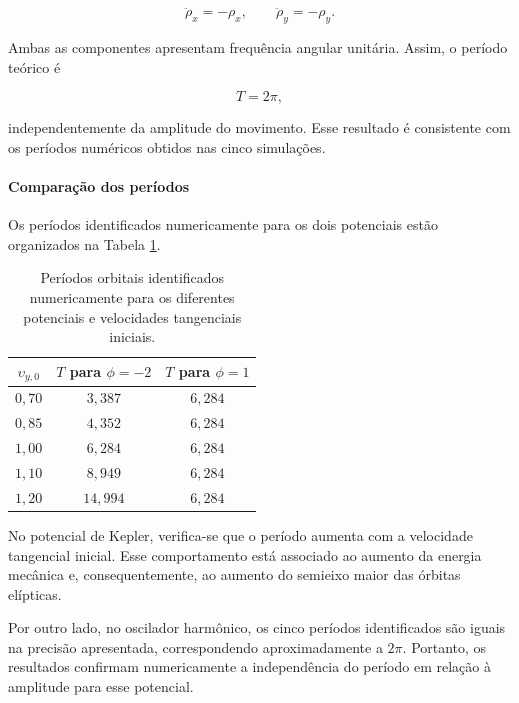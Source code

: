 \documentclass[12pt,a4paper]{article}
\begin{document}
\begin{equation}
    \ddot{\rho}_x=-\rho_x,
    \qquad
    \ddot{\rho}_y=-\rho_y.
\end{equation}

Ambas as componentes apresentam frequência angular unitária. Assim, o período teórico é

\begin{equation}
    T=2\pi,
\end{equation}

independentemente da amplitude do movimento. Esse resultado é consistente com os períodos numéricos obtidos nas cinco simulações.

\paragraph{Comparação dos períodos}

Os períodos identificados numericamente para os dois potenciais estão organizados na Tabela \ref{tab:periodos-kepler-harmonico}.

\begin{table}[htbp]
    \centering
    \caption{Períodos orbitais identificados numericamente para os diferentes potenciais e velocidades tangenciais iniciais.}
    \label{tab:periodos-kepler-harmonico}
    \begin{tabular}{c c c}
        \hline
        $\upsilon_{y,0}$ &
        $T$ para $\phi=-2$ &
        $T$ para $\phi=1$ \\
        \hline
        $0,70$ & $3,387$ & $6,284$ \\
        $0,85$ & $4,352$ & $6,284$ \\
        $1,00$ & $6,284$ & $6,284$ \\
        $1,10$ & $8,949$ & $6,284$ \\
        $1,20$ & $14,994$ & $6,284$ \\
        \hline
    \end{tabular}
\end{table}

No potencial de Kepler, verifica-se que o período aumenta com a velocidade tangencial inicial. Esse comportamento está associado ao aumento da energia mecânica e, consequentemente, ao aumento do semieixo maior das órbitas elípticas.

Por outro lado, no oscilador harmônico, os cinco períodos identificados são iguais na precisão apresentada, correspondendo aproximadamente a $2\pi$. Portanto, os resultados confirmam numericamente a independência do período em relação à amplitude para esse potencial.
\end{document}
